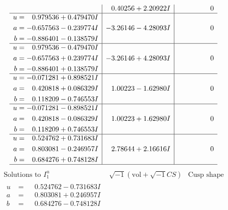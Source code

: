 \documentclass[1p]{elsarticle_modified}
\theoremstyle{definition}
\newcommand{\I}{\sqrt{-1}}
\begin{document}
$$\begin{array}{c|c|c}
 & \phantom{-}0.40256 + 2.20922 I & \phantom{-0.000000 } 0 \\ \hline\begin{aligned}
u &= \phantom{-}0.979536 + 0.479470 I \\
a &= -0.657563 - 0.239774 I \\
b &= -0.886401 - 0.138579 I\end{aligned}
 & -3.26146 - 4.28093 I & \phantom{-0.000000 } 0 \\ \hline\begin{aligned}
u &= \phantom{-}0.979536 - 0.479470 I \\
a &= -0.657563 + 0.239774 I \\
b &= -0.886401 + 0.138579 I\end{aligned}
 & -3.26146 + 4.28093 I & \phantom{-0.000000 } 0 \\ \hline\begin{aligned}
u &= -0.071281 + 0.898521 I \\
a &= \phantom{-}0.420818 + 0.086329 I \\
b &= \phantom{-}0.118209 - 0.746553 I\end{aligned}
 & \phantom{-}1.00223 - 1.62980 I & \phantom{-0.000000 } 0 \\ \hline\begin{aligned}
u &= -0.071281 - 0.898521 I \\
a &= \phantom{-}0.420818 - 0.086329 I \\
b &= \phantom{-}0.118209 + 0.746553 I\end{aligned}
 & \phantom{-}1.00223 + 1.62980 I & \phantom{-0.000000 } 0 \\ \hline\begin{aligned}
u &= \phantom{-}0.524762 + 0.731683 I \\
a &= \phantom{-}0.803081 - 0.246957 I \\
b &= \phantom{-}0.684276 + 0.748128 I\end{aligned}
 & \phantom{-}2.78644 + 2.16616 I & \phantom{-0.000000 } 0\\
 \hline 
 \end{array}$$\newpage$$\begin{array}{c|c|c}  
\text{Solutions to }I^u_{1}& \I (\text{vol} + \sqrt{-1}CS) & \text{Cusp shape}\\
 \hline 
\begin{aligned}
u &= \phantom{-}0.524762 - 0.731683 I \\
a &= \phantom{-}0.803081 + 0.246957 I \\
b &= \phantom{-}0.684276 - 0.748128 I\end{aligned}

\end{array}$$
\end{document}
